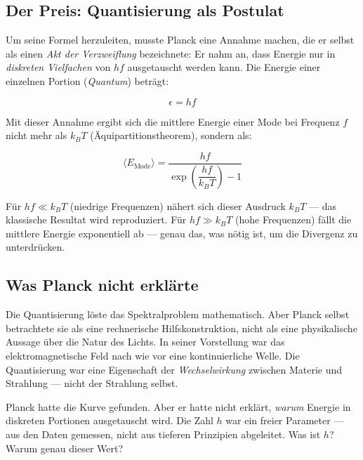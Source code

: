 \subsection{Der Preis: Quantisierung als Postulat}

Um seine Formel herzuleiten, musste Planck eine Annahme machen, die er selbst als 
einen \emph{Akt der Verzweiflung} bezeichnete: Er nahm an, dass Energie nur in 
\emph{diskreten Vielfachen} von $hf$ ausgetauscht werden kann. Die Energie einer 
einzelnen Portion (\emph{Quantum}) beträgt:

\begin{equation}
    \epsilon = hf
    \label{eq:planck_quantum}
\end{equation}

Mit dieser Annahme ergibt sich die mittlere Energie einer Mode bei Frequenz $f$ nicht 
mehr als $k_BT$ (Äquipartitionstheorem), sondern als:

\begin{equation}
    \langle E_{\text{Mode}} \rangle = \frac{hf}{\exp\!\left(\dfrac{hf}{k_BT}\right) - 1}
    \label{eq:planck_mean_energy}
\end{equation}

Für $hf \ll k_BT$ (niedrige Frequenzen) nähert sich dieser Ausdruck $k_BT$ — das 
klassische Resultat wird reproduziert. Für $hf \gg k_BT$ (hohe Frequenzen) fällt die 
mittlere Energie exponentiell ab — genau das, was nötig ist, um die Divergenz zu 
unterdrücken.

\subsection{Was Planck nicht erklärte}

Die Quantisierung löste das Spektralproblem mathematisch. Aber Planck selbst betrachtete 
sie als eine rechnerische Hilfskonstruktion, nicht als eine physikalische Aussage über 
die Natur des Lichts. In seiner Vorstellung war das elektromagnetische Feld nach wie 
vor eine kontinuierliche Welle. Die Quantisierung war eine Eigenschaft der 
\emph{Wechselwirkung} zwischen Materie und Strahlung — nicht der Strahlung selbst.

\begin{keyresult}
    Planck hatte die Kurve gefunden. Aber er hatte nicht erklärt, \emph{warum} Energie 
    in diskreten Portionen ausgetauscht wird. Die Zahl $h$ war ein freier Parameter — 
    aus den Daten gemessen, nicht aus tieferen Prinzipien abgeleitet. 
    Was ist $h$? Warum genau dieser Wert?
\end{keyresult}

